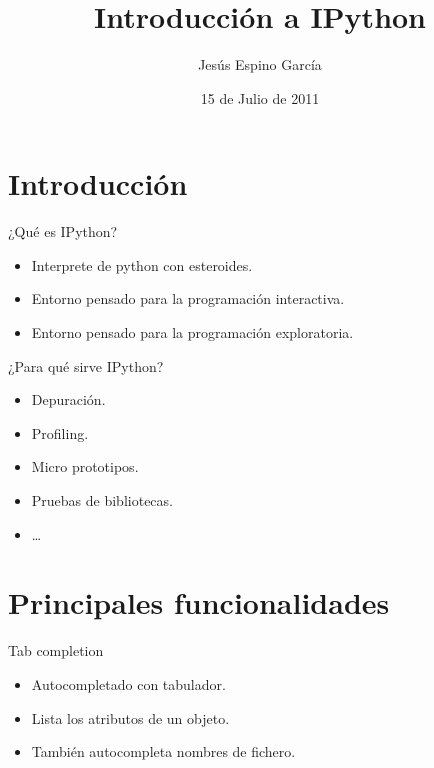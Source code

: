 \documentclass[10pt]{beamer}
\title{Introducción a IPython}
\author{Jesús Espino García}
\date{15 de Julio de 2011}
\institute[Python Madrid 2011]{Kaleidos\\Python Madrid 2011}
\begin{document}
  \frame{\maketitle}


  \section*{Introducción}
  \begin{frame}{¿Qué es IPython?}
    \begin{itemize}
      \item Interprete de python con esteroides.
      \item Entorno pensado para la programación interactiva.
      \item Entorno pensado para la programación exploratoria.
    \end{itemize}
  \end{frame}
  
  \begin{frame}{¿Para qué sirve IPython?}
    \begin{itemize}
      \item Depuración.
      \item Profiling.
      \item Micro prototipos.
      \item Pruebas de bibliotecas.
      \item \dots{}
    \end{itemize}
  \end{frame}
  
  \section*{Principales funcionalidades}
  \begin{frame}{Tab completion}
    \begin{itemize}
      \item Autocompletado con tabulador.
      \item Lista los atributos de un objeto.
      \item También autocompleta nombres de fichero.
    \end{itemize}
  \end{frame}
\end{document}
